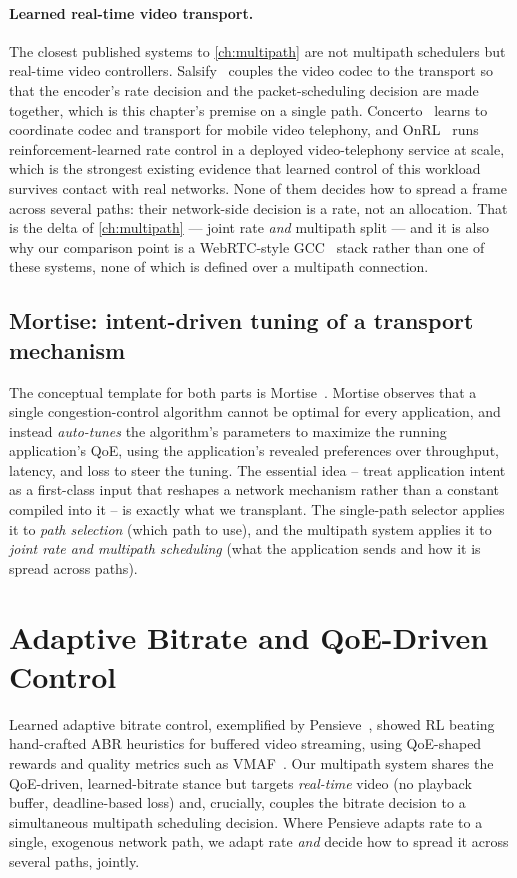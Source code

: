 \paragraph{Learned real-time video transport.} The closest published systems to \cref{ch:multipath} are
not multipath schedulers but real-time video controllers. Salsify~\cite{Fouladi2018} couples the video
codec to the transport so that the encoder's rate decision and the packet-scheduling decision are made
together, which is this chapter's premise on a single path. Concerto~\cite{Zhou2019} learns to
coordinate codec and transport for mobile video telephony, and OnRL~\cite{Zhang2020} runs
reinforcement-learned rate control in a deployed video-telephony service at scale, which is the
strongest existing evidence that learned control of this workload survives contact with real networks.
None of them decides how to spread a frame across several paths: their network-side decision is a rate,
not an allocation. That is the delta of \cref{ch:multipath} --- joint rate \emph{and} multipath split ---
and it is also why our comparison point is a WebRTC-style GCC~\cite{Carlucci2016} stack rather than one
of these systems, none of which is defined over a multipath connection.

\subsection{Mortise: intent-driven tuning of a transport mechanism}
The conceptual template for both parts is Mortise~\cite{Shen2026}. Mortise observes that a single
congestion-control algorithm cannot be optimal for every application, and instead \emph{auto-tunes}
the algorithm's parameters to maximize the running application's QoE, using the application's revealed
preferences over throughput, latency, and loss to steer the tuning. The essential idea -- treat
application intent as a first-class input that reshapes a network mechanism rather than a constant
compiled into it -- is exactly what we transplant. The single-path selector applies it to \emph{path selection} (which
path to use), and the multipath system applies it to \emph{joint rate and multipath scheduling} (what
the application sends and how it is spread across paths).

\section{Adaptive Bitrate and QoE-Driven Control}
\label{sec:rel:abr}

Learned adaptive bitrate control, exemplified by Pensieve~\cite{Mao2017}, showed RL beating hand-crafted ABR
heuristics for buffered video streaming, using QoE-shaped rewards and quality metrics such as
VMAF~\cite{VMAF2016}. Our multipath system shares the QoE-driven, learned-bitrate stance but targets \emph{real-time}
video (no playback buffer, deadline-based loss) and, crucially, couples the bitrate decision to a
simultaneous multipath scheduling decision. Where Pensieve adapts rate to a single, exogenous network path,
we adapt rate \emph{and} decide how to spread it across several paths, jointly.

